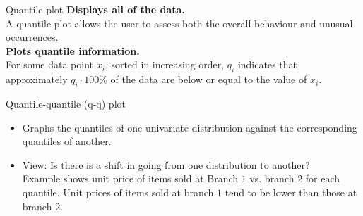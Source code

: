 \documentclass[aspectratio=169,t]{beamer}
\begin{document}
  { 
    \begin{frame}{Quantile plot}
    \textbf{Displays all of the data.}\\
    A quantile plot allows the user to assess both the overall behaviour and unusual occurrences.\\[0.5cm]
    \textbf{Plots quantile information.}\\
    For some data point $x_i$, sorted in increasing order, $q_i$ indicates that approximately $q_i \cdot 100 \%$ of the data are below or equal to the value of $x_i$.\\[0.2cm]
    \centering
    \end{frame}
  }

  { 
    \begin{frame}{Quantile-quantile (q-q) plot}
    \begin{itemize}
      \item Graphs the quantiles of one univariate distribution against the corresponding quantiles of another.
      \item View: Is there is a shift in going from one distribution to another?\\
      Example shows unit price of items sold at Branch $1$ vs. branch $2$ for each quantile.  Unit prices of items sold at branch $1$ tend to be lower than those at branch $2$.
    \end{itemize}\vspace{0.5cm}
    \centering
    \end{frame}
  }
\end{document}
